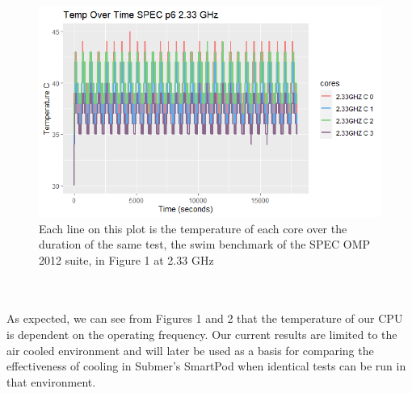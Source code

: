 \documentclass[sigconf]{acmart}
\begin{document}
\begin{figure}[h]
    \centering
    \includegraphics[scale=.55]{p06temp233ghz.png}
    \caption{Each line on this plot is the temperature of each core over the duration of the same test, the swim benchmark of the SPEC OMP 2012 suite, in Figure 1 at 2.33 GHz}
\end{figure}
\\\\
As expected, we can see from Figures 1 and 2 that the temperature of our CPU is dependent on the operating frequency. Our current results are limited to the air cooled environment and will later be used as a basis for comparing the effectiveness of cooling in Submer's SmartPod when identical tests can be run in that environment. 
\end{document}
